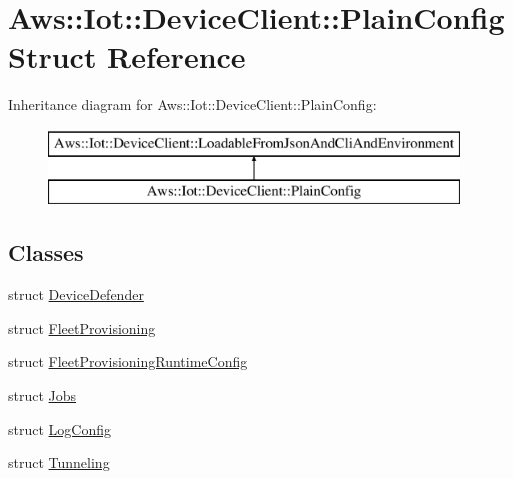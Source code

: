 \hypertarget{struct_aws_1_1_iot_1_1_device_client_1_1_plain_config}{}\section{Aws\+:\+:Iot\+:\+:Device\+Client\+:\+:Plain\+Config Struct Reference}
\label{struct_aws_1_1_iot_1_1_device_client_1_1_plain_config}
Inheritance diagram for Aws\+:\+:Iot\+:\+:Device\+Client\+:\+:Plain\+Config\+:\begin{figure}[H]
\begin{center}
\leavevmode
\includegraphics[height=2.000000cm]{struct_aws_1_1_iot_1_1_device_client_1_1_plain_config}
\end{center}
\end{figure}
\subsection*{Classes}
\begin{DoxyCompactItemize}
\item 
struct \hyperlink{struct_aws_1_1_iot_1_1_device_client_1_1_plain_config_1_1_device_defender}{Device\+Defender}
\item 
struct \hyperlink{struct_aws_1_1_iot_1_1_device_client_1_1_plain_config_1_1_fleet_provisioning}{Fleet\+Provisioning}
\item 
struct \hyperlink{struct_aws_1_1_iot_1_1_device_client_1_1_plain_config_1_1_fleet_provisioning_runtime_config}{Fleet\+Provisioning\+Runtime\+Config}
\item 
struct \hyperlink{struct_aws_1_1_iot_1_1_device_client_1_1_plain_config_1_1_jobs}{Jobs}
\item 
struct \hyperlink{struct_aws_1_1_iot_1_1_device_client_1_1_plain_config_1_1_log_config}{Log\+Config}
\item 
struct \hyperlink{struct_aws_1_1_iot_1_1_device_client_1_1_plain_config_1_1_tunneling}{Tunneling}
\end{DoxyCompactItemize}
